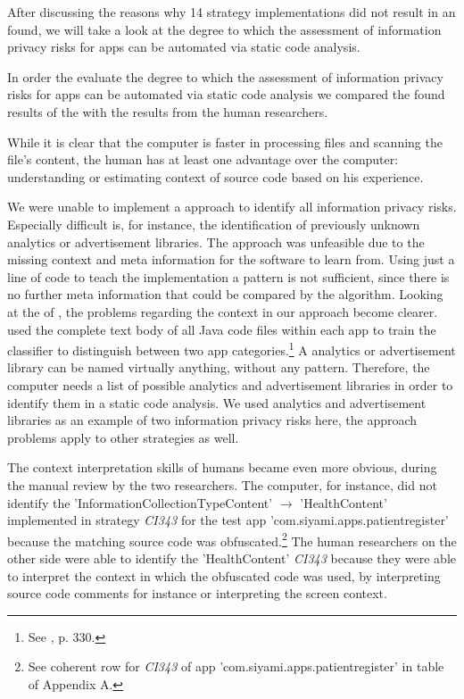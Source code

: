 After discussing the reasons why 14 strategy implementations did not result in an \ipr found, we will take a look at the degree to which the assessment of information privacy risks for \mH apps can be automated via static code analysis.

In order the evaluate the degree to which the assessment of information privacy risks for \mH apps can be automated via static code analysis we compared the \ipr found results of the \aiprat with the results from the human researchers.

While it is clear that the computer is faster in processing files and scanning the file's content, the human has at least one advantage over the computer: understanding or estimating context of source code based on his experience.

We were unable to implement a \ml approach to identify all information privacy risks.
Especially difficult is, for instance, the identification of previously unknown analytics or advertisement libraries.
The \ml approach was unfeasible due to the missing context and meta information for the software to learn from.
Using just a line of code to teach the \ml implementation a pattern is not sufficient, since there is no further meta information that could be compared by the algorithm.
Looking at the \ml of \textcite{Shabtai2010}, the problems regarding the context in our approach become clearer.
\textcite{Shabtai2010} used the complete text body of all Java code files within each app to train the \ml classifier to distinguish between two app categories.\footnote{See \cite{Shabtai2010}, p. 330.}
A analytics or advertisement library can be named virtually anything, without any pattern.
Therefore, the computer needs a list of possible analytics and advertisement libraries in order to identify them in a static code analysis.
We used analytics and advertisement libraries as an example of two information privacy risks here, the \ml approach problems apply to other \ipr strategies as well.

The context interpretation skills of humans became even more obvious, during the manual review by the two researchers.
The computer, for instance, did not identify the \ipr 'InformationCollectionTypeContent' $\rightarrow$ 'HealthContent' implemented in strategy \textit{CI343} for the test app 'com.siyami.apps.patientregister' because the matching source code was obfuscated.\footnote{See coherent row for \textit{CI343} of app 'com.siyami.apps.patientregister'  in table of Appendix A.}
The human researchers on the other side were able to identify the 'HealthContent' \textit{CI343} \ipr because they were able to interpret the context in which the obfuscated code was used, by interpreting source code comments for instance or interpreting the screen context.

